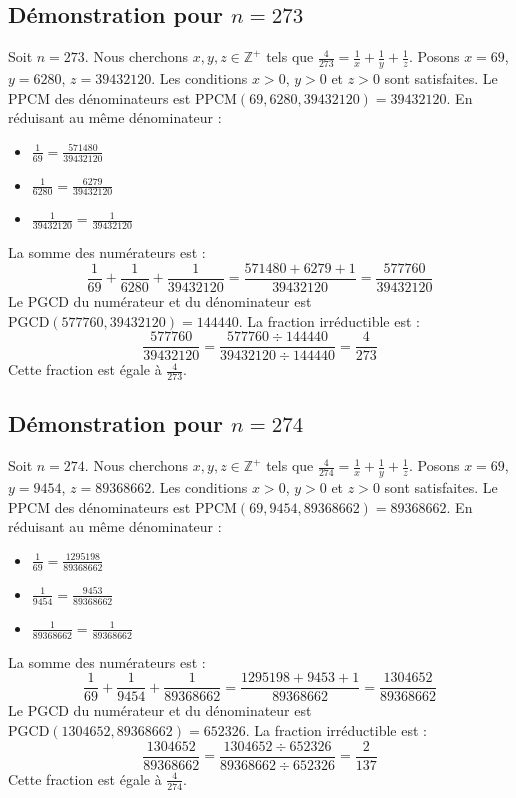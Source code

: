 \documentclass[11pt,a4paper]{article}
\begin{document}
\subsection{Démonstration pour $n = 273$}
Soit $n = 273$. Nous cherchons $x, y, z \in \mathbb{Z}^{+}$ tels que $\frac{4}{273} = \frac{1}{x} + \frac{1}{y} + \frac{1}{z}$.
Posons $x = 69$, $y = 6280$, $z = 39432120$.
Les conditions $x > 0$, $y > 0$ et $z > 0$ sont satisfaites.
Le PPCM des dénominateurs est $\text{PPCM}(69, 6280, 39432120) = 39432120$.
En réduisant au même dénominateur :
\begin{itemize}
    \item $\frac{1}{69} = \frac{571480}{39432120}$
    \item $\frac{1}{6280} = \frac{6279}{39432120}$
    \item $\frac{1}{39432120} = \frac{1}{39432120}$
\end{itemize}
La somme des numérateurs est :
$$ \frac{1}{69} + \frac{1}{6280} + \frac{1}{39432120} = \frac{571480 + 6279 + 1}{39432120} = \frac{577760}{39432120} $$
Le PGCD du numérateur et du dénominateur est $\text{PGCD}(577760, 39432120) = 144440$.
La fraction irréductible est :
$$ \frac{577760}{39432120} = \frac{577760 \div 144440}{39432120 \div 144440} = \frac{4}{273} $$
Cette fraction est égale à $\frac{4}{273}$.

\subsection{Démonstration pour $n = 274$}
Soit $n = 274$. Nous cherchons $x, y, z \in \mathbb{Z}^{+}$ tels que $\frac{4}{274} = \frac{1}{x} + \frac{1}{y} + \frac{1}{z}$.
Posons $x = 69$, $y = 9454$, $z = 89368662$.
Les conditions $x > 0$, $y > 0$ et $z > 0$ sont satisfaites.
Le PPCM des dénominateurs est $\text{PPCM}(69, 9454, 89368662) = 89368662$.
En réduisant au même dénominateur :
\begin{itemize}
    \item $\frac{1}{69} = \frac{1295198}{89368662}$
    \item $\frac{1}{9454} = \frac{9453}{89368662}$
    \item $\frac{1}{89368662} = \frac{1}{89368662}$
\end{itemize}
La somme des numérateurs est :
$$ \frac{1}{69} + \frac{1}{9454} + \frac{1}{89368662} = \frac{1295198 + 9453 + 1}{89368662} = \frac{1304652}{89368662} $$
Le PGCD du numérateur et du dénominateur est $\text{PGCD}(1304652, 89368662) = 652326$.
La fraction irréductible est :
$$ \frac{1304652}{89368662} = \frac{1304652 \div 652326}{89368662 \div 652326} = \frac{2}{137} $$
Cette fraction est égale à $\frac{4}{274}$.
\end{document}
